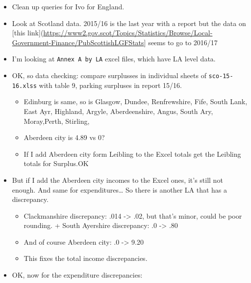 \documentclass[]{article}
\providecommand{\tightlist}{%
  \setlength{\itemsep}{0pt}\setlength{\parskip}{0pt}}
\begin{document}
\begin{itemize}
\tightlist
\item
  Clean up queries for Ivo for England.
\item
  Look at Scotland data. 2015/16 is the last year with a report but the
  data on {[}this
  link{]}(\url{https://www2.gov.scot/Topics/Statistics/Browse/Local-Government-Finance/PubScottishLGFStats}{]}
  seems to go to 2016/17
\item
  I'm looking at \texttt{Annex\ A\ by\ LA} excel files, which have LA
  level data.
\item
  OK, so data checking: compare surplusses in individual sheets of
  \texttt{sco-15-16.xlss} with table 9, parking surpluses in report
  15/16.

  \begin{itemize}
  \tightlist
  \item
    Edinburg is same, so is Glasgow, Dundee, Renfrewshire, Fife, South
    Lank, East Ayr, Highland, Argyle, Aberdeenshire, Angus, South Ary,
    Moray,Perth, Stirling,
  \item
    Aberdeen city is 4.89 vs 0?
  \item
    If I add Aberdeen city form Leibling to the Excel totals get the
    Leibling totals for Surplus.OK
  \end{itemize}
\item
  But if I add the Aberdeen city incomes to the Excel ones, it's still
  not enough. And same for expenditures\ldots{} So there is another LA
  that has a discrepancy.

  \begin{itemize}
  \tightlist
  \item
    Clackmanshire discrepancy: .014 -\textgreater{} .02, but that's
    minor, could be poor rounding. + South Ayershire discrepancy: .0
    -\textgreater{} .80
  \item
    And of course Aberdeen city: .0 -\textgreater{} 9.20
  \item
    This fixes the total income discrepancies.
  \end{itemize}
\item
  OK, now for the expenditure discrepancies:


\end{itemize}
\end{document}

